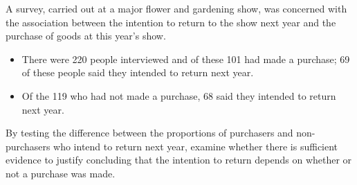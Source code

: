 \item 
A survey, carried out at a major flower and gardening show, was concerned with the association between the intention to return to the show next year and the purchase of goods at this year's show.
\begin{itemize}
	\item There were 220 people interviewed and of these 101 had made a purchase; 69 of these people said they intended to return next year. 
	\item Of the 119 who had not made a purchase, 68 said they intended to return next year.
\end{itemize}
By testing the difference between the proportions of purchasers and non-purchasers who intend to return next year, examine whether there is sufficient evidence to justify concluding that the intention to return depends on whether or not a purchase was made.
